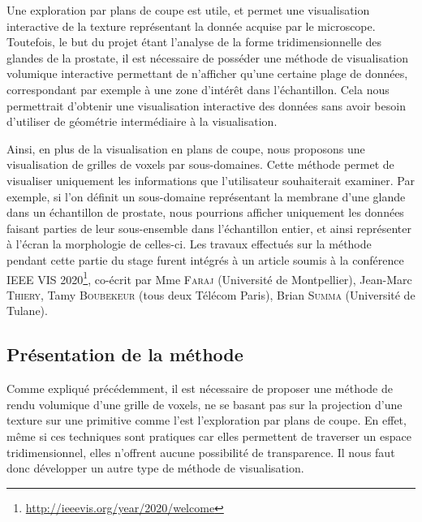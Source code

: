 {{		%
		Une exploration par plans de coupe est utile, et permet une visualisation interactive de la texture représentant la donnée acquise par le microscope. Toutefois, le but du projet étant l'analyse de la forme tridimensionnelle des glandes de la prostate, il est nécessaire de posséder une méthode de visualisation volumique interactive permettant de n'afficher qu'une certaine plage de données, correspondant par exemple à une zone d'intérêt dans l'échantillon. Cela nous permettrait d'obtenir une visualisation interactive des données sans avoir besoin d'utiliser de géométrie intermédiaire à la visualisation.

		Ainsi, en plus de la visualisation en plans de coupe, nous proposons une visualisation de grilles de voxels par sous-domaines. Cette méthode permet de visualiser uniquement les informations que l'utilisateur souhaiterait examiner. Par exemple, si l'on définit un sous-domaine représentant la membrane d'une glande dans un échantillon de prostate, nous pourrions afficher uniquement les données faisant parties de leur sous-ensemble dans l'échantillon entier, et ainsi représenter à l'écran la morphologie de celles-ci. Les travaux effectués sur la méthode pendant cette partie du stage furent intégrés à un article soumis à la conférence IEEE VIS 2020\footnote{\url{http://ieeevis.org/year/2020/welcome}}, co-écrit par Mme \textsc{Faraj} (Université de Montpellier), Jean-Marc \textsc{Thiery}, Tamy \textsc{Boubekeur} (tous deux Télécom Paris), Brian \textsc{Summa} (Université de Tulane).\par

		\subsection{Présentation de la méthode}
		{
		    Comme expliqué précédemment, il est nécessaire de proposer une méthode de rendu volumique d'une grille de voxels, ne se basant pas sur la projection d'une texture sur une primitive comme l'est l'exploration par plans de coupe. En effet, même si ces techniques sont pratiques car elles permettent de traverser un espace tridimensionnel, elles n'offrent aucune possibilité de transparence. Il nous faut donc développer un autre type de méthode de visualisation.

}}}
